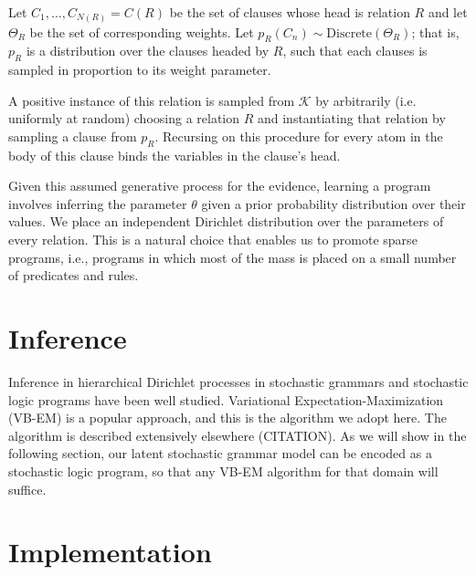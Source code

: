 \documentclass[11pt, twocolumn]{article}
\begin{document}
Let $C_1, \dots, C_{N(R)} = C(R)$ be the set of clauses whose head is
relation $R$ and let $\Theta_R$ be the set of corresponding
weights. Let $p_R(C_n) \sim \text{Discrete}(\Theta_R)$; that is, $p_R$
is a distribution over the clauses headed by $R$, such that each
clauses is sampled in proportion to its weight parameter.

A positive instance of this relation is sampled from $\mathcal{K}$ by
arbitrarily (i.e. uniformly at random) choosing a relation $R$ and
instantiating that relation by sampling a clause from $p_R$. Recursing
on this procedure for every atom in the body of this clause binds the
variables in the clause's head. 

Given this assumed generative process for the evidence, learning a
program involves inferring the parameter $\theta$ given a prior
probability distribution over their values. We place an independent
Dirichlet distribution over the parameters of every relation. This is
a natural choice that enables us to promote sparse programs, i.e.,
programs in which most of the mass is placed on a small number of
predicates and rules.

\section{Inference}
Inference in hierarchical Dirichlet processes in stochastic grammars
and stochastic logic programs have been well studied. Variational
Expectation-Maximization (VB-EM) is a popular approach, and this is
the algorithm we adopt here. The algorithm is described extensively
elsewhere (CITATION). As we will show in the following section, our
latent stochastic grammar model can be encoded as a stochastic logic
program, so that any VB-EM algorithm for that domain will suffice. 

\section{Implementation}

\end{document}
